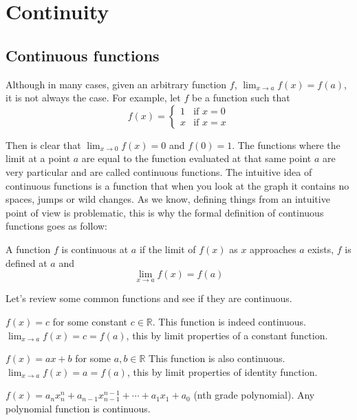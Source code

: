 \documentclass{report}
\begin{document}
\chapter{Continuity}

\section{Continuous functions}

Although in many cases, given an arbitrary function $f$, $\lim_{x \to a} f(x) = f(a)$, it is not always the case. For example, let $f$ be a function such that
$$f(x) = \begin{cases}
        1 & \text{if } x =0 \\
        x & \text{if } x=x
    \end{cases}$$

Then is clear that $\lim_{x \to 0} f(x) = 0$ and $f(0) = 1$. The functions where the limit at a point $a$ are equal to the function evaluated at that same point $a$ are very particular and are called continuous functions. The intuitive idea of continuous functions is a function that when you look at the graph it contains no spaces, jumps or wild changes. As we know, defining things from an intuitive point of view is problematic, this is why the formal definition of continuous functions goes as follow:\\

\begin{defBox}
    A function $f$ is continuous at $a$ if the limit of $f(x)$ as $x$ approaches $a$ exists, $f$ is defined at $a$ and $$\lim_{x \to a}f(x) = f(a)$$
\end{defBox}

Let's review some common functions and see if they are continuous.

\begin{Example}
    $f(x) = c$ for some constant $c \in \mathbb{R}$. This function is indeed continuous. $\lim_{x \to a}f(x) = c = f(a)$, this by limit properties of a constant function.
\end{Example}

\begin{Example}
    $f(x) = ax+b$ for some $a, b \in \mathbb{R}$ This function is also continuous. $\lim_{x \to a}f(x) = a = f(a)$, this by limit properties of identity function.
\end{Example}

\begin{Example}
    $f(x) = a_nx^n_n + a_{n-1}x^{n-1}_{n-1}+\cdots + a_1x_1 + a_0$ (nth grade polynomial). Any polynomial function is continuous.
\end{Example}
\end{document}
